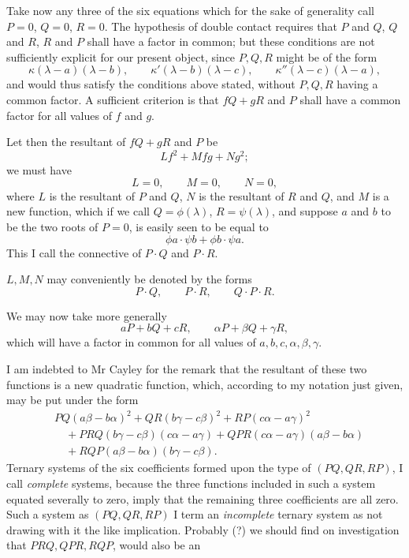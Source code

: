\documentclass[11pt]{article}
\newcommand{\sourcepage}[1]{\marginpar{\scriptsize p.~#1}}
\begin{document}
{{\sourcepage{130}
Take now any three of the six equations which for the sake of generality call $P=0$, $Q=0$, $R=0$. The hypothesis of double contact requires that $P$ and $Q$, $Q$ and $R$, $R$ and $P$ shall have a factor in common; but these conditions are not sufficiently explicit for our present object, since $P,Q,R$ might be of the form
\[
\kappa(\lambda-a)(\lambda-b),\qquad
\kappa'(\lambda-b)(\lambda-c),\qquad
\kappa''(\lambda-c)(\lambda-a),
\]
and would thus satisfy the conditions above stated, without $P,Q,R$ having a common factor. A sufficient criterion is that $fQ+gR$ and $P$ shall have a common factor for all values of $f$ and $g$.

Let then the resultant of $fQ+gR$ and $P$ be
\[
Lf^2+Mfg+Ng^2;
\]
we must have
\[
L=0,\qquad M=0,\qquad N=0,
\]
where $L$ is the resultant of $P$ and $Q$, $N$ is the resultant of $R$ and $Q$, and $M$ is a new function, which if we call $Q=\phi(\lambda)$, $R=\psi(\lambda)$, and suppose $a$ and $b$ to be the two roots of $P=0$, is easily seen to be equal to
\[
\phi a\cdot\psi b+\phi b\cdot\psi a.
\]
This I call the connective of $P\cdot Q$ and $P\cdot R$.

$L,M,N$ may conveniently be denoted by the forms
\[
P\cdot Q,\qquad P\cdot R,\qquad Q\cdot P\cdot R.
\]

We may now take more generally
\[
aP+bQ+cR,\qquad
\alpha P+\beta Q+\gamma R,
\]
which will have a factor in common for all values of $a,b,c,\alpha,\beta,\gamma$.

I am indebted to Mr Cayley for the remark that the resultant of these two functions is a new quadratic function, which, according to my notation just given, may be put under the form
\[
\begin{aligned}
&PQ(a\beta-b\alpha)^2+QR(b\gamma-c\beta)^2+RP(c\alpha-a\gamma)^2\\
&\quad+PRQ(b\gamma-c\beta)(c\alpha-a\gamma)
+QPR(c\alpha-a\gamma)(a\beta-b\alpha)\\
&\quad+RQP(a\beta-b\alpha)(b\gamma-c\beta).
\end{aligned}
\]
Ternary systems of the six coefficients formed upon the type of $(PQ,QR,RP)$, I call \emph{complete} systems, because the three functions included in such a system equated severally to zero, imply that the remaining three coefficients are all zero. Such a system as $(PQ,QR,RP)$ I term an \emph{incomplete} ternary system as not drawing with it the like implication. Probably (?) we should find on investigation that $PRQ,QPR,RQP$, would also be an

}}
\end{document}

